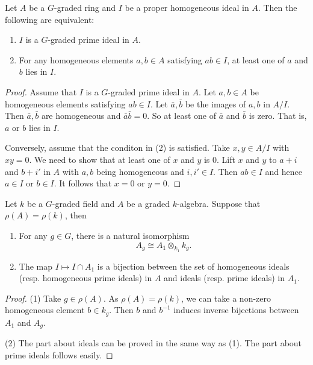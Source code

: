 \begin{proposition}
    Let $A$ be a $G$-graded ring and $I$ be a proper homogeneous ideal in $A$. Then the following are equivalent:
    \begin{enumerate}
        \item $I$ is a $G$-graded prime ideal in $A$.
        \item For any homogeneous elements $a,b\in A$ satisfying $ab\in I$, at least one of $a$ and $b$ lies in $I$.
    \end{enumerate}
\end{proposition}
\begin{proof}
    Assume that $I$ is a $G$-graded prime ideal in $A$. Let $a,b\in A$ be homogeneous elements satisfying $ab\in I$. Let $\bar{a},\bar{b}$ be the images of $a,b$ in $A/I$. Then $\bar{a},\bar{b}$ are homogeneous and $\bar{a}\bar{b}=0$. So at least one of $\bar{a}$ and $\bar{b}$ is zero. That is, $a$ or $b$ lies in $I$.

    Conversely, assume that the conditon in (2) is satisfied. Take $x,y\in A/I$ with $xy=0$. We need to show that at least one of $x$ and $y$ is $0$. Lift $x$ and $y$ to $a+i$ and $b+i'$ in $A$ with $a,b$ being homogeneous and $i,i'\in I$. Then $ab\in I$ and hence $a\in I$ or $b\in I$. It follows that $x=0$ or $y=0$. 
\end{proof}

\begin{lemma}
    Let $k$ be a $G$-graded field and $A$ be a graded $k$-algebra. Suppose that $\rho(A)=\rho(k)$, then
    \begin{enumerate}
        \item For any $g\in G$, there is a natural isomorphism
            \[
                A_g\cong A_1 \otimes_{k_1} k_g.
            \]
        \item The map $I\mapsto I\cap A_1$ is a bijection between the set of homogeneous ideals (resp. homogeneous prime ideals) in $A$ and ideals (resp. prime ideals) in $A_1$.
    \end{enumerate}
\end{lemma}
\begin{proof}
    (1) Take $g\in \rho(A)$. As $\rho(A)=\rho(k)$, we can take a non-zero homogeneous element $b\in k_g$. Then $b$ and $b^{-1}$ induces inverse bijections between $A_1$ and $A_g$.

    (2) The part about ideals can be proved in the same way as (1). The part about prime ideals follows easily.
\end{proof}

